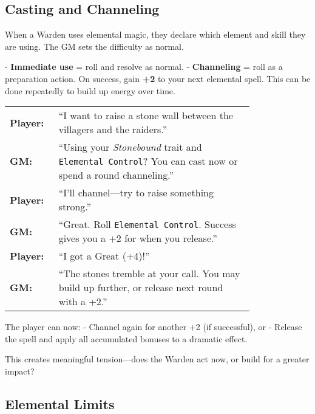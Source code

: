 \subsection{Casting and Channeling}


When a Warden uses elemental magic, they declare which element and skill they are using. The GM sets the difficulty as normal.

- \textbf{Immediate use} = roll and resolve as normal.
- \textbf{Channeling} = roll as a preparation action. On success, gain \textbf{+2} to your next elemental spell. This can be done repeatedly to build up energy over time.

\begin{Example}
    \begin{tabular}{@{}l p{0.8\linewidth}@{}}
        \textbf{Player:} & “I want to raise a stone wall between the villagers and the raiders.” \\
        \textbf{GM:} & “Using your \textit{Stonebound} trait and \texttt{Elemental Control}? You can cast now or spend a round channeling.” \\
        \textbf{Player:} & “I’ll channel—try to raise something strong.” \\
        \textbf{GM:} & “Great. Roll \texttt{Elemental Control}. Success gives you a +2 for when you release.” \\
        \textbf{Player:} & “I got a Great (+4)!” \\
        \textbf{GM:} & “The stones tremble at your call. You may build up further, or release next round with a +2.”
    \end{tabular}
\end{Example}

The player can now:
- Channel again for another +2 (if successful), or  
- Release the spell and apply all accumulated bonuses to a dramatic effect.

This creates meaningful tension—does the Warden act now, or build for a greater impact?

\subsection{Elemental Limits}

